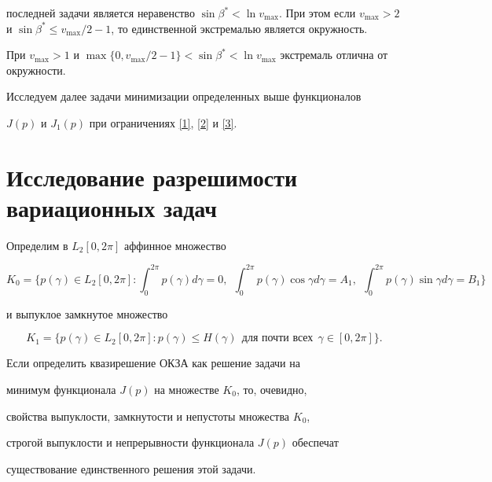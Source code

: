 последней задачи является неравенство $ \sin\beta^{*} < \ln


v_{\max}$. При этом если $v_{\max} > 2$ и $ \sin \beta^{*} \leq


v_{\max}/2-1$, то единственной экстремалью является окружность.


При $v_{\max} > 1$ и $\max \{0, v_{\max}/2-1\} < \sin \beta^{*} <


\ln v_{\max}$ экстремаль отлична от окружности.





Исследуем далее задачи минимизации определенных выше функционалов


$J(p)$ и $J_1(p)$ при ограничениях \eqref{1}, \eqref{2} и \eqref{3}.





\section{Исследование разрешимости вариационных задач}





Определим в $L_2 [0, 2\pi]$ аффинное множество


$$


K_{0}=\bigg\{p(\gamma) \in L_2 [0, 2\pi]:


 \int_{0}^{2\pi} p(\gamma) d\gamma=0, \ \ 


\int_{0}^{2\pi} p(\gamma)\cos\gamma d\gamma =A_1,


\ \ \int_{0}^{2\pi}


p(\gamma)\sin\gamma d\gamma =B_1 \bigg\}


$$


и выпуклое замкнутое множество


$$


K_{1}=\{p(\gamma) \in L_2 [0, 2\pi]:


p(\gamma)\leq H(\gamma) \ \ \text{для почти всех} \ \ \gamma \in [0,2\pi] \}.


$$


Если определить квазирешение ОКЗА как решение задачи на


минимум функционала $J(p)$ на множестве $K_{0}$, то, очевидно,


свойства выпуклости, замкнутости и непустоты множества $K_{0}$,


строгой выпуклости и непрерывности функционала $J(p)$ обеспечат


существование единственного решения этой задачи.


